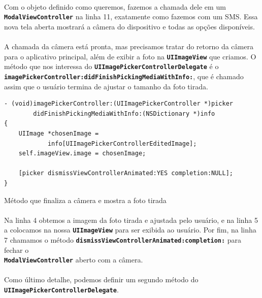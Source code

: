 \documentclass[a4paper,12pt,brazil,doubleside]{book}
\begin{document}
\begin{singlespace}
\paragraph{}Com o objeto definido como queremos, fazemos a chamada dele em um\\ \texttt{\textbf{ModalViewController}} na linha 11, exatamente como fazemos com um SMS. Essa nova tela aberta mostrará a câmera do dispositivo e todas as opções disponíveis.
\paragraph{}A chamada da câmera está pronta, mas precisamos tratar do retorno da câmera para o aplicativo principal, além de exibir a foto na \texttt{\textbf{UIImageView}} que criamos. O método que nos interessa do \texttt{\textbf{UIImagePickerControllerDelegate}} é o\\ \texttt{\textbf{imagePickerController:didFinishPickingMediaWithInfo:}}, que é chamado assim que o usuário termina de ajustar o tamanho da foto tirada.

\begin{listing}[H]
\begin{verbatim}
- (void)imagePickerController:(UIImagePickerController *)picker
        didFinishPickingMediaWithInfo:(NSDictionary *)info
{
    UIImage *chosenImage =
            info[UIImagePickerControllerEditedImage];
    self.imageView.image = chosenImage;
    
    [picker dismissViewControllerAnimated:YES completion:NULL];
}
\end{verbatim}
\caption{Método que finaliza a câmera e mostra a foto tirada}
\end{listing}

\paragraph{}Na linha 4 obtemos a imagem da foto tirada e ajustada pelo usuário, e na linha 5 a colocamos na nossa \texttt{\textbf{UIImageView}} para ser exibida ao usuário. Por fim, na linha 7 chamamos o método \texttt{\textbf{dismissViewControllerAnimated:completion:}} para fechar o\\ \texttt{\textbf{ModalViewController}} aberto com a câmera.
\paragraph{}Como último detalhe, podemos definir um segundo método do\\ \texttt{\textbf{UIImagePickerControllerDelegate}}.


\end{singlespace}
\end{document}
